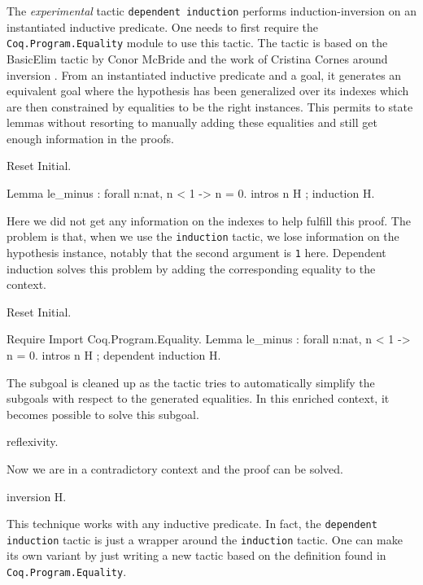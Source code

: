 \begin{coq_example*}
The \emph{experimental} tactic \texttt{dependent induction} performs
induction-inversion on an instantiated inductive predicate.
One needs to first require the {\tt Coq.Program.Equality} module to use
this tactic. The tactic is based on the BasicElim tactic by Conor
McBride \cite{DBLP:conf/types/McBride00} and the work of Cristina Cornes
around inversion \cite{DBLP:conf/types/CornesT95}. From an instantiated
inductive predicate and a goal, it generates an equivalent goal where the
hypothesis has been generalized over its indexes which are then
constrained by equalities to be the right instances. This permits to
state lemmas without resorting to manually adding these equalities and
still get enough information in the proofs.

\Example

\begin{coq_eval}
Reset Initial.
\end{coq_eval}
\begin{coq_example}
Lemma le_minus : forall n:nat, n < 1 -> n = 0.
intros n H ; induction H.
\end{coq_example}

Here we did not get any information on the indexes to help fulfill this
proof. The problem is that, when we use the \texttt{induction} tactic,
we lose information on the hypothesis instance, notably that the second
argument is \texttt{1} here. Dependent induction solves this problem by
adding the corresponding equality to the context.

\begin{coq_eval}
Reset Initial.
\end{coq_eval}
\begin{coq_example}
Require Import Coq.Program.Equality.
Lemma le_minus : forall n:nat, n < 1 -> n = 0.
intros n H ; dependent induction H.
\end{coq_example}

The subgoal is cleaned up as the tactic tries to automatically
simplify the subgoals with respect to the generated equalities.
In this enriched context, it becomes possible to solve this subgoal.
\begin{coq_example}
reflexivity.
\end{coq_example}

Now we are in a contradictory context and the proof can be solved.
\begin{coq_example}
inversion H.
\end{coq_example}

This technique works with any inductive predicate.
In fact, the \texttt{dependent induction} tactic is just a wrapper around
the \texttt{induction} tactic. One can make its own variant by just
writing a new tactic based on the definition found in
\texttt{Coq.Program.Equality}.


\end{coq_example*}
